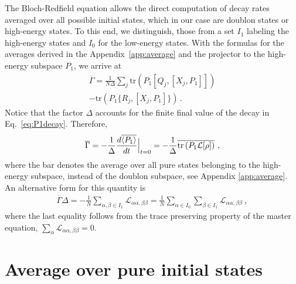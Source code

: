 \documentclass[twocolumn,prb,showpacs]{revtex4-1}
\DeclarePairedDelimiter\mean{\langle}{\rangle}
\newcommand*{\diff}{d}
\newcommand*{\tr}[1]{\mathrm{tr}\left(#1\right)}
\begin{document}
The Bloch-Redfield equation allows the direct computation of decay rates
averaged over all possible initial states, which in our case are doublon
states or high-energy states.  To this end, we distinguish, those from a
set $I_1$ labeling the high-energy states and $I_0$ for the low-energy
states.  With the formulas for the averages derived in the
Appendix~\ref{app:average} and the projector to the high-energy subspace
$P_1$, we arrive at
\begin{multline}
    \overline{\Gamma}=\frac{1}{N\Delta}\sum_j \tr{P_1[Q_j,[X_j,P_1]]} \\
    -\tr{P_1\{R_j,[X_j,P_1]\}} \,.
    \label{eq:decay_occup}
\end{multline}
Notice that the factor $\Delta$ accounts for the finite final value of the
decay in Eq.~\eqref{eq:P1decay}.  Therefore,
\begin{equation}
\label{rateA}
    \overline{\Gamma}=-\frac{1}{\Delta}\frac{\diff\overline{\mean{P_1}}}{\diff
    t}\Big|_{t=0}
    =-\frac{1}{\Delta} \overline{\tr{P_1\mathcal{L}[\rho]}} \ , 
\end{equation}
where the bar denotes the average over all pure states belonging to the
high-energy subspace, instead of the doublon subspace, see Appendix
\ref{app:average}. An alternative form for this quantity is
\begin{align}
\label{rateAB}
 \overline{\Gamma}\Delta
= -\frac{1}{N}\sum_{\alpha,\beta\in I_1}\mathcal{L}_{\alpha\alpha,\beta\beta} 
= \frac{1}{N}\sum_{\alpha\in I_0} \sum_{\beta\in I_1}\mathcal{L}_{\alpha\alpha,\beta\beta}\ ,
\end{align}
where the last equality follows from the trace preserving property
of the master equation, 
$\sum_\alpha \mathcal{L}_{\alpha\alpha,\beta\beta} = 0$.

\section{Average over pure initial states \label{app:average}}
\end{document}
